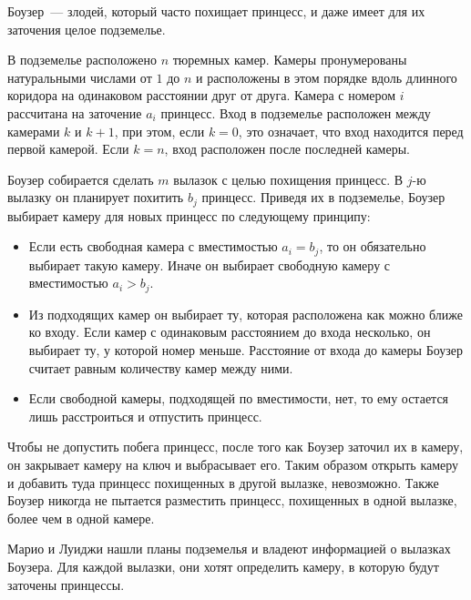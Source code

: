 Боузер~--- злодей, который часто похищает принцесс, и даже имеет для их заточения целое подземелье. 

В подземелье расположено $n$ тюремных камер. Камеры пронумерованы натуральными числами от $1$ до $n$ и расположены в этом порядке вдоль длинного коридора на одинаковом расстоянии друг от друга. Камера с номером $i$ рассчитана на заточение $a_i$ принцесс. Вход в подземелье расположен между камерами $k$ и $k + 1$, при этом, если $k = 0$, это означает, что вход находится перед первой камерой. Если $k = n$, вход расположен после последней камеры.

Боузер собирается сделать $m$ вылазок с целью похищения принцесс. В $j$-ю вылазку он планирует похитить $b_j$ принцесс. Приведя их в подземелье, 
Боузер выбирает камеру для новых принцесс по следующему принципу:
\begin{itemize}
\item Если есть свободная камера с вместимостью $a_i = b_j$, то он обязательно выбирает такую камеру. Иначе он выбирает свободную камеру с вместимостью $a_i > b_j$.
\item Из подходящих камер он выбирает ту, которая расположена как можно ближе ко входу. Если камер с одинаковым расстоянием до входа несколько, он выбирает ту, у которой номер меньше. Расстояние от входа до камеры Боузер считает равным количеству камер между ними.
\item Если свободной камеры, подходящей по вместимости, нет, то ему остается лишь расстроиться и отпустить принцесс.
\end{itemize}
Чтобы не допустить побега принцесс, после того как Боузер заточил их в камеру, он закрывает камеру на ключ и выбрасывает его. Таким образом открыть камеру и добавить туда принцесс похищенных в другой вылазке, невозможно. Также Боузер никогда не пытается разместить принцесс, похищенных в одной вылазке, более чем в одной камере.

Марио и Луиджи нашли планы подземелья и владеют информацией о вылазках Боузера. Для каждой вылазки, они хотят определить камеру, в которую будут заточены принцессы.